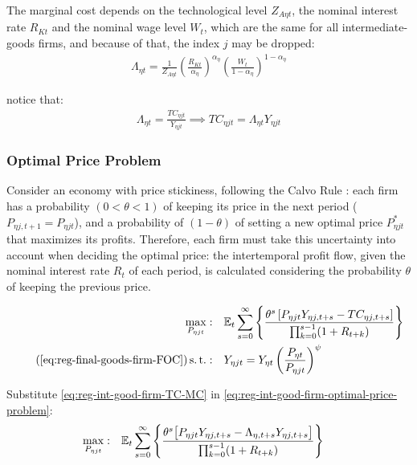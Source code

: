 \documentclass[../thesis.tex]{subfiles}
\begin{document}
The marginal cost depends on the technological level $Z_{A\eta t}$, the nominal interest rate $R_{Kt}$ and the nominal wage level $W_t$, which are the same for all intermediate-goods firms, and because of that, the index $j$ may be dropped:
\begin{align}
	\label{eq:reg-int-good-firm-MC-2}
	\Lambda_{\eta t} = \frac{1}{Z_{A\eta t}} \left( \frac{R_{Kt}}{{\alpha_{\eta}}} \right)^{{\alpha_{\eta}}} \left( \frac{W_t}{1-{\alpha_{\eta}}} \right)^{1-{\alpha_{\eta}}}
\end{align}

notice that:
\begin{align}
	\label{eq:reg-int-good-firm-TC-MC}
	\Lambda_{\eta t} = \frac{TC_{\eta jt}}{Y_{\eta jt}} \implies 
	TC_{\eta jt} = \Lambda_{\eta t} Y_{\eta jt}
\end{align}


\subsubsection*{Optimal Price Problem}

Consider an economy with price stickiness, following the Calvo Rule \cite{calvo_staggered_1983}: each firm has a probability $(0 < \theta < 1)$ of keeping its price in the next period ($P_{\eta j,t+1} = P_{\eta jt}$), and a probability of $(1 - \theta)$ of setting a new optimal price $P_{\eta jt}^{\ast}$ that maximizes its profits. Therefore, each firm must take this uncertainty into account when deciding the optimal price: the intertemporal profit flow, given the nominal interest rate $R_{t}$ of each period, is calculated considering the probability $\theta$ of keeping the previous price.

\begin{align}
	\label{eq:reg-int-good-firm-optimal-price-problem}
	\max_{P_{\eta jt}}: & \quad \E \sum_{s=0}^{\infty} \left\{ \frac{ \theta^s \left[ P_{\eta jt} Y_{\eta j,t+s} - TC_{\eta j,t+s} \right]}{\prod_{k=0}^{s-1}(1+R_{t+k})} \right\} \\
	\tag{\ref{eq:reg-final-goods-firm-FOC}}
	\st: & \quad Y_{\eta jt} = Y_{\eta t} \left( \frac{P_{\eta t}}{P_{\eta jt}} \right)^{\psi}
\end{align}


Substitute \ref{eq:reg-int-good-firm-TC-MC} in \ref{eq:reg-int-good-firm-optimal-price-problem}:
\begin{align}
	\label{eq:reg-int-good-firm-optimal-price-problem-2}
	\max_{P_{\eta jt}}: & \quad {\mathbb{E}_{t}} \sum_{s=0}^{\infty} \left\{ \frac{\theta^s \big[ P_{\eta jt} Y_{\eta j,t+s} - \Lambda_{\eta, t+s} Y_{\eta j,t+s} \big]}{\prod_{k=0}^{s-1}(1+R_{t+k})} \right\}
\end{align}
\end{document}
